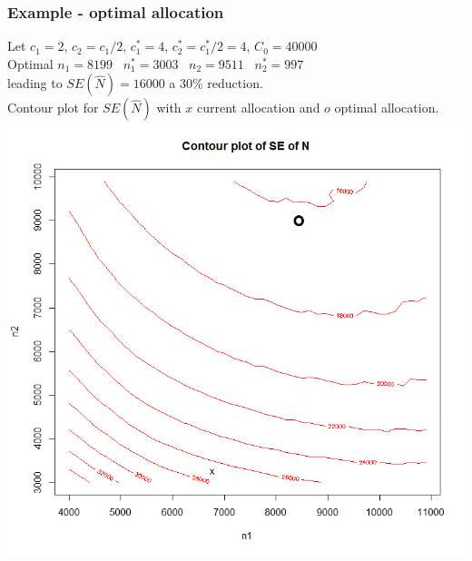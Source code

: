 \documentclass{beamer}
\begin{document}
\begin{frame} \frametitle{Example - optimal allocation}
Let $c_{1} =2 $, $c_{2} =c_{1}/2$, $c_{1}^{*} = 4$, $c_{2}^{*} = c_{1}^{*}/2 = 4$, $C_{0} =40000$\\[5mm]

 Optimal $n_{1} = 8199 $ \  $n_{1}^{*} = 3003$  \  $n_{2} = 9511$ \  $n_{2}^{*} = 997$ \\
 leading to $SE(\widehat{N}) = 16000$ a 30\% reduction.\\[2mm]
 
Contour plot for $SE(\widehat{N})$ with $x$ current allocation and $o$ optimal allocation.\\
\includegraphics[scale=.20]{2014_05_19Contour_plot.png}

\end{frame}
\end{document}
